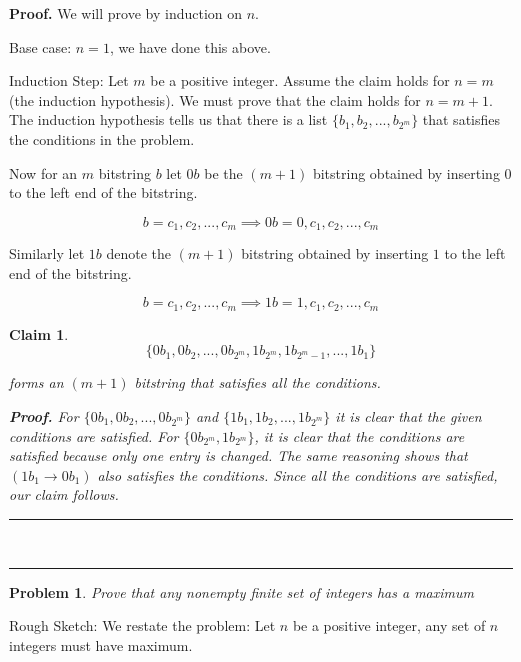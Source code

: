 \documentclass{article}
\newtheorem{claim}[theorem]{Claim}
\newtheorem{problem}[theorem]{Problem}
\newenvironment{proof}[1][Proof]{\noindent\textbf{#1.} }{\ \rule{0.5em}{0.5em}}
\begin{document}
\begin{proof}
We will prove by induction on $n$.

Base case: $n=1$, we have done this above.

Induction Step: Let $m$ be a positive integer. Assume the claim holds for $%
n=m$ (the induction hypothesis). We must prove that the claim holds for $%
n=m+1$. The induction hypothesis tells us that there is a list $%
\{b_{1},b_{2},...,b_{2^{m}}\}$ that satisfies the conditions in the problem.

Now for an $m$ bitstring $b$ let $0b$ be the $(m+1)$ bitstring obtained by
inserting $0$ to the left end of the bitstring.

\begin{equation*}
b=c_{1},c_{2},...,c_{m}\implies 0b=0,c_{1},c_{2},...,c_{m}
\end{equation*}

Similarly let $1b$ denote the $(m+1)$ bitstring obtained by inserting $1$ to
the left end of the bitstring.

\begin{equation*}
b=c_{1},c_{2},...,c_{m}\implies 1b=1,c_{1},c_{2},...,c_{m}
\end{equation*}

\begin{claim}
\begin{equation*}
\{0b_{1},0b_{2},...,0b_{2^{m}},1b_{2^{m}},1b_{2^{m}-1},...,1b_{1}\}
\end{equation*}

forms an $(m+1)$ bitstring that satisfies all the conditions.

\begin{proof}
For $\{0b_{1},0b_{2},...,0b_{2^{m}}\}$ and $\{1b_{1},1b_{2},...,1b_{2^{m}}\}$
it is clear that the given conditions are satisfied. For $%
\{0b_{2^{m}},1b_{2^{m}}\}$, it is clear that the conditions are satisfied
because only one entry is changed. The same reasoning shows that $%
(1b_{1}\rightarrow 0b_{1})$ also satisfies the conditions. Since all the
conditions are satisfied, our claim follows.
\end{proof}
\end{claim}
\end{proof}

\bigskip

\begin{problem}
Prove that any nonempty finite set of integers has a maximum
\end{problem}

Rough Sketch: We restate the problem: Let $n$ be a positive integer, any set
of $n$ integers must have maximum.
\end{document}
